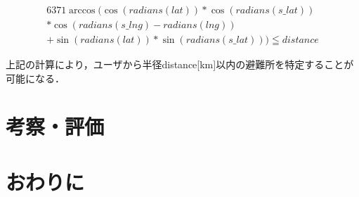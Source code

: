 \documentclass[technicalreport]{ieicej}
\begin{document}
\begin{eqnarray*}
    6371 \arccos ( \cos( radians( lat ) ) * \cos( radians( s\_lat ) ) \\* \cos( radians( s\_lng ) - radians( lng ) ) \\+ \sin( radians( lat ) ) * \sin( radians( s\_lat ) ) ) \leqq distance
\end{eqnarray*}

上記の計算により，ユーザから半径distance[km]以内の避難所を特定することが可能になる．



\subsection{}

\section{考察・評価}

\section{おわりに}


%
%
\begin{thebibliography}{99}%
\bibitem{}
\end{thebibliography}
\end{document}

